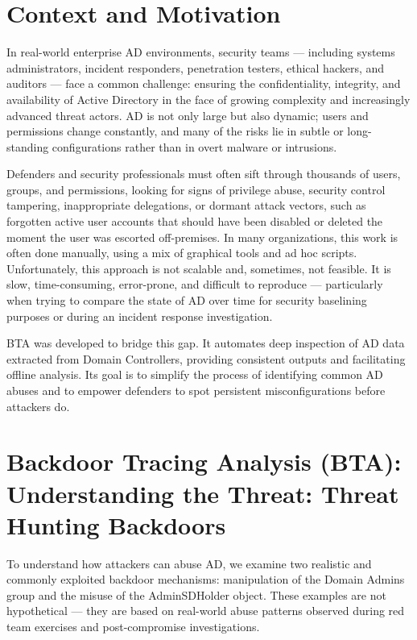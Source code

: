 \section{Context and Motivation}

In real-world enterprise AD environments, security teams — including systems administrators, incident responders, penetration testers, ethical hackers, and auditors — face a common challenge: ensuring the confidentiality, integrity, and availability of Active Directory in the face of growing complexity and increasingly advanced threat actors. AD is not only large but also dynamic; users and permissions change constantly, and many of the risks lie in subtle or long-standing configurations rather than in overt malware or intrusions.

Defenders and security professionals must often sift through thousands of users, groups, and permissions, looking for signs of privilege abuse, security control tampering, inappropriate delegations, or dormant attack vectors, such as forgotten active user accounts that should have been disabled or deleted the moment the user was escorted off-premises. In many organizations, this work is often done manually, using a mix of graphical tools and ad hoc scripts. Unfortunately, this approach is not scalable and, sometimes, not feasible. It is slow, time-consuming, error-prone, and difficult to reproduce — particularly when trying to compare the state of AD over time for security baselining purposes or during an incident response investigation.

BTA was developed to bridge this gap. It automates deep inspection of AD data extracted from Domain Controllers, providing consistent outputs and facilitating offline analysis. Its goal is to simplify the process of identifying common AD abuses and to empower defenders to spot persistent misconfigurations before attackers do.

\section{Backdoor Tracing Analysis (BTA): Understanding the Threat: Threat Hunting Backdoors}

To understand how attackers can abuse AD, we examine two realistic and commonly exploited backdoor mechanisms: manipulation of the Domain Admins group and the misuse of the AdminSDHolder object. These examples are not hypothetical — they are based on real-world abuse patterns observed during red team exercises and post-compromise investigations.

